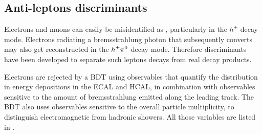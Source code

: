 \subsection{Anti-leptons discriminants}

Electrons and muons can easily be misidentified as \tauh, particularly in the $h^{\pm}$ decay mode. Electrons radiating a bremsstrahlung photon that subsequently converts may also get reconstructed in the $h^{\pm}\pi^{0}$ decay mode. Therefore discriminants have been developed to separate such leptons decays from real \tauh decay products.

Electrons are rejected by a BDT using observables that quantify the distribution in energy depositions in the ECAL and HCAL, in combination with observables sensitive to the amount of bremsstrahlung emitted along the leading track. The BDT also uses observables sensitive to the overall particle multiplicity, to distinguish electromagnetic from hadronic showers.
All those variables are listed in \cite{tauh_reconstruction}.
    
